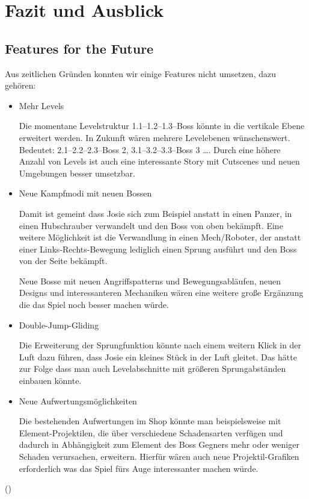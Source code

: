 \chapter{Fazit und Ausblick}

\section{Features for the Future}

Aus zeitlichen Gründen konnten wir einige Features nicht umsetzen, dazu gehören:

\begin{itemize}

\item Mehr Levels

Die momentane Levelstruktur 1.1--1.2--1.3--Boss könnte in die vertikale Ebene erweitert werden. In Zukunft wären mehrere Levelebenen wünschenswert. Bedeutet: 2.1--2.2--2.3--Boss 2,  3.1--3.2--3.3--Boss 3 \dots. Durch eine höhere Anzahl von Levels ist auch eine interessante Story mit Cutscenes und neuen Umgebungen besser umsetzbar. 

\item Neue Kampfmodi mit neuen Bossen

Damit ist gemeint dass Josie sich zum Beispiel anstatt in einen Panzer, in einen Hubschrauber verwandelt und den Boss von oben bekämpft. Eine weitere Möglichkeit ist die Verwandlung in einen Mech/Roboter, der anstatt einer Links-Rechts-Bewegung lediglich einen Sprung ausführt und den Boss von der Seite bekämpft.

Neue Bosse mit neuen Angriffspatterns und Bewegungsabläufen, neuen Designs und interessanteren Mechaniken wären eine weitere große Ergänzung die das Spiel noch besser machen würde.

\item Double-Jump-Gliding

Die Erweiterung der Sprungfunktion könnte nach einem weitern Klick in der Luft dazu führen, dass Josie ein kleines Stück in der Luft gleitet. Das hätte zur Folge dass man auch Levelabschnitte mit größeren Sprungabständen einbauen könnte.

\item Neue Aufwertungsmöglichkeiten

Die bestehenden Aufwertungen im Shop könnte man beispielsweise mit Element-Projektilen, die über verschiedene Schadensarten verfügen und dadurch in Abhängigkeit zum Element des Boss Gegners mehr oder weniger Schaden verursachen, erweitern. Hierfür wären auch neue Projektil-Grafiken erforderlich was das Spiel fürs Auge interessanter machen würde.



\end{itemize}
()